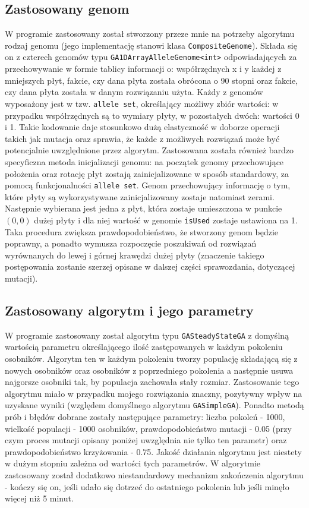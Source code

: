 \documentclass[11pt,a4paper,oneside]{article}
\begin{document}
\subsection{Zastosowany genom}
W programie zastosowany został stworzony przeze mnie na potrzeby algorytmu rodzaj genomu (jego implementację stanowi klasa \lstinline{CompositeGenome}). Składa się on z czterech genomów typu \lstinline{GA1DArrayAlleleGenome<int>} odpowiadających za przechowywanie w formie tablicy informacji o: współrzędnych x i y każdej z mniejszych płyt, fakcie, czy dana płyta została obrócona o 90 stopni oraz fakcie, czy dana płyta została w danym rozwiązaniu użyta. Każdy z genomów wyposażony jest w tzw. \lstinline{allele set}, określający możliwy zbiór wartości: w przypadku współrzędnych są to wymiary płyty, w pozostałych dwóch: wartości 0 i 1. Takie kodowanie daje stosunkowo dużą elastyczność w doborze operacji takich jak mutacja oraz sprawia, że każde z możliwych rozwiązań może być potencjalnie uwzględnione przez algorytm. Zastosowana została również bardzo specyficzna metoda inicjalizacji genomu: na początek genomy przechowujące położenia oraz rotację płyt zostają zainicjalizowane w sposób standardowy, za pomocą funkcjonalności \lstinline{allele set}. Genom przechowujący informację o tym, które płyty są wykorzystywane zainicjalizowany zostaje natomiast zerami. Następnie wybierana jest jedna z płyt, która zostaje umieszczona w punkcie $(0, 0)$ dużej płyty i dla niej wartość w genomie \lstinline{isUsed} zostaje ustawiona na 1. Taka procedura zwiększa prawdopodobieństwo, że stworzony genom będzie poprawny, a ponadto wymusza rozpoczęcie poszukiwań od rozwiązań wyrównanych do lewej i górnej krawędzi dużej płyty (znaczenie takiego postępowania zostanie szerzej opisane w dalszej części sprawozdania, dotyczącej mutacji).


\subsection{Zastosowany algorytm i jego parametry}
W programie zastosowany został algorytm typu \lstinline{GASteadyStateGA} z domyślną wartością parametru określającego ilość zastępowanych w każdym pokoleniu osobników. Algorytm ten w każdym pokoleniu tworzy populację składającą się z nowych osobników oraz osobników z poprzedniego pokolenia a następnie usuwa najgorsze osobniki tak, by populacja zachowała stały rozmiar. Zastosowanie tego algorytmu miało w przypadku mojego rozwiązania znaczny, pozytywny wpływ na uzyskane wyniki (względem domyślnego algorytmu \lstinline{GASimpleGA}). Ponadto metodą prób i błędów dobrane zostały następujące parametry: liczba pokoleń - 1000, wielkość populacji - 1000 osobników, prawdopodobieństwo mutacji - 0.05 (przy czym proces mutacji opisany poniżej uwzględnia nie tylko ten parametr) oraz prawdopodobieństwo krzyżowania - 0.75. Jakość działania algorytmu jest niestety w dużym stopniu zależna od wartości tych parametrów. W algorytmie zastosowany został dodatkowo niestandardowy mechanizm zakończenia algorytmu - kończy się on, jeśli udało się dotrzeć do ostatniego pokolenia lub jeśli minęło więcej niż 5 minut.
\end{document}
